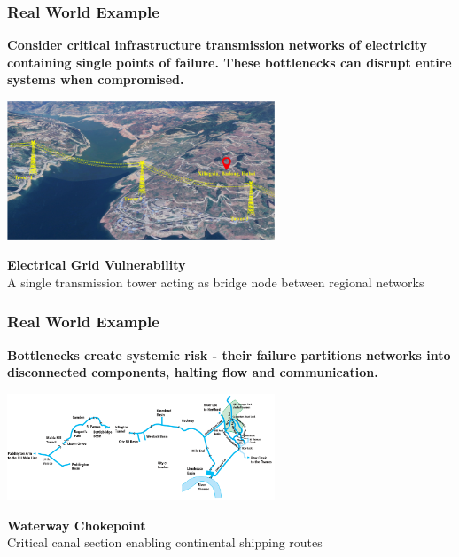 






\begin{frame}
    \frametitle{Real World Example}
    \large\textbf{Consider critical infrastructure transmission networks of electricity containing single points of failure. These bottlenecks can disrupt entire systems when compromised.}
    
    \vspace*{15pt}
    \centering
    \includegraphics[width=0.6\textwidth]{figures/general/transmission-network.png}
    \vspace*{5pt}
    
    \textbf{Electrical Grid Vulnerability} \\
    \small A single transmission tower acting as bridge node between regional networks
\end{frame}

\begin{frame}
    \frametitle{Real World Example}
    \large\textbf{Bottlenecks create systemic risk - their failure partitions networks into disconnected components, halting flow and communication.}
    
    \vspace*{15pt}
    \centering
    \includegraphics[width=0.6\textwidth]{figures/general/canal-network.png}
    \vspace*{5pt}
    
    \textbf{Waterway Chokepoint} \\
    \small Critical canal section enabling continental shipping routes
\end{frame}


